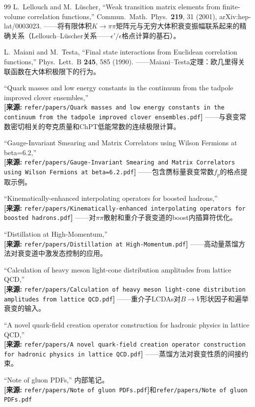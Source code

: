 \documentclass[12pt,a4paper]{ctexart}
\theoremstyle{definition}
\begin{document}
\begin{thebibliography}{99}
L.~Lellouch and M.~L\"uscher,
``Weak transition matrix elements from finite-volume correlation functions,''
Commun.\ Math.\ Phys.\ \textbf{219}, 31 (2001), arXiv:hep-lat/0003023.
——将有限体积$K\to\pi\pi$矩阵元与无穷大体积衰变振幅联系起来的精确关系（Lellouch--L\"uscher关系——$\epsilon'/\epsilon$格点计算的基石）。

L.~Maiani and M.~Testa,
``Final state interactions from Euclidean correlation functions,''
Phys.\ Lett.\ B \textbf{245}, 585 (1990).
——Maiani--Testa定理：欧几里得关联函数在大体积极限下的行为。

``Quark masses and low energy constants in the continuum from the tadpole improved clover ensembles,''
\\\textbf{[来源:} \texttt{refer/papers/Quark masses and low energy constants in the continuum from the tadpole improved clover ensembles.pdf}\textbf{]}
——与衰变常数密切相关的夸克质量和ChPT低能常数的连续极限计算。

``Gauge-Invariant Smearing and Matrix Correlators using Wilson Fermions at beta=6.2,''
\\\textbf{[来源:} \texttt{refer/papers/Gauge-Invariant Smearing and Matrix Correlators using Wilson Fermions at beta=6.2.pdf}\textbf{]}
——包含赝标量衰变常数$f_p$的格点提取示例。

``Kinematically-enhanced interpolating operators for boosted hadrons,''
\\\textbf{[来源:} \texttt{refer/papers/Kinematically-enhanced interpolating operators for boosted hadrons.pdf}\textbf{]}
——对$\pi\pi$散射和重介子衰变道的boost内插算符优化。

``Distillation at High-Momentum,''
\\\textbf{[来源:} \texttt{refer/papers/Distillation at High-Momentum.pdf}\textbf{]}
——高动量蒸馏方法对衰变道中激发态控制的应用。

``Calculation of heavy meson light-cone distribution amplitudes from lattice QCD,''
\\\textbf{[来源:} \texttt{refer/papers/Calculation of heavy meson light-cone distribution amplitudes from lattice QCD.pdf}\textbf{]}
——重介子LCDAs对$B\to V$形状因子和遍举衰变的输入。

``A novel quark-field creation operator construction for hadronic physics in lattice QCD,''
\\\textbf{[来源:} \texttt{refer/papers/A novel quark-field creation operator construction for hadronic physics in lattice QCD.pdf}\textbf{]}
——蒸馏方法对衰变性质的间接约束。

``Note of gluon PDFs,'' 内部笔记。
\\\textbf{[来源:} \texttt{refer/papers/Note of gluon PDFs.pdf}\textbf{]}和\texttt{refer/papers/Note of gluon PDFs.pdf}

\end{thebibliography}
\end{document}
